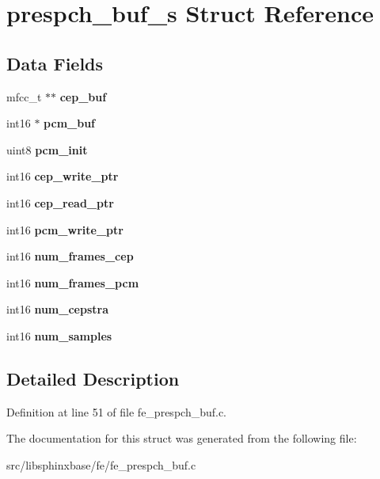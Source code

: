 \section{prespch\-\_\-buf\-\_\-s Struct Reference}
\label{structprespch__buf__s}
\subsection*{Data Fields}
\begin{DoxyCompactItemize}
\item 
mfcc\-\_\-t $\ast$$\ast$ {\bfseries cep\-\_\-buf}\label{structprespch__buf__s_a6c1208eb567b0f2a123759dfe4579256}

\item 
int16 $\ast$ {\bfseries pcm\-\_\-buf}\label{structprespch__buf__s_afc6fa1099e52f5383e4fb7f8c16e8f03}

\item 
uint8 {\bfseries pcm\-\_\-init}\label{structprespch__buf__s_ad306dec932badd6040596c5e1b8a8ea5}

\item 
int16 {\bfseries cep\-\_\-write\-\_\-ptr}\label{structprespch__buf__s_a339e0d13ddf808334cf0a28dd59f8e8c}

\item 
int16 {\bfseries cep\-\_\-read\-\_\-ptr}\label{structprespch__buf__s_a380d3aa29d8823a15c76055205f5d588}

\item 
int16 {\bfseries pcm\-\_\-write\-\_\-ptr}\label{structprespch__buf__s_aff9e8911f9717eed3b33eee8fab9c329}

\item 
int16 {\bfseries num\-\_\-frames\-\_\-cep}\label{structprespch__buf__s_a42b2da72f0ab5c5fa4622daa175676da}

\item 
int16 {\bfseries num\-\_\-frames\-\_\-pcm}\label{structprespch__buf__s_a3914d87504a031a083dd0c4c080b31de}

\item 
int16 {\bfseries num\-\_\-cepstra}\label{structprespch__buf__s_a8899b6abcea28de536b0abf8e6387072}

\item 
int16 {\bfseries num\-\_\-samples}\label{structprespch__buf__s_a8898e72d558042738d1ad92d2e3c7b1e}

\end{DoxyCompactItemize}


\subsection{Detailed Description}


Definition at line 51 of file fe\-\_\-prespch\-\_\-buf.\-c.



The documentation for this struct was generated from the following file\-:\begin{DoxyCompactItemize}
\item 
src/libsphinxbase/fe/fe\-\_\-prespch\-\_\-buf.\-c\end{DoxyCompactItemize}
